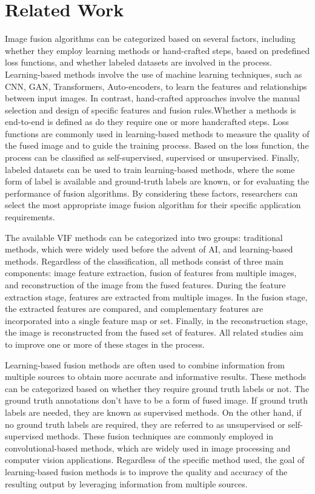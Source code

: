 \chapter{Related Work}
\label{chp:02bgwork}

Image fusion algorithms can be categorized based on several factors, including whether they employ learning methods or hand-crafted steps, based on predefined loss functions, and whether labeled datasets are involved in the process. Learning-based methods involve the use of machine learning techniques, such as CNN, GAN, Transformers, Auto-encoders, to learn the features and relationships between input images. In contrast, hand-crafted approaches involve the manual selection and design of specific features and fusion rules.Whether a methods is end-to-end is defined as do they require one or more handcrafted steps. Loss functions are commonly used in learning-based methods to measure the quality of the fused image and to guide the training process. Based on the loss function, the process can be classified as self-supervised, supervised or unsupervised. Finally, labeled datasets can be used to train learning-based methods, where the some form of label is available and ground-truth labels are known, or for evaluating the performance of fusion algorithms. By considering these factors, researchers can select the most appropriate image fusion algorithm for their specific application requirements.

The available VIF methods can be categorized into two groups: traditional methods, which were widely used before the advent of AI, and learning-based methods. Regardless of the classification, all methods consist of three main components: image feature extraction, fusion of features from multiple images, and reconstruction of the image from the fused features. During the feature extraction stage, features are extracted from multiple images. In the fusion stage, the extracted features are compared, and complementary features are incorporated into a single feature map or set. Finally, in the reconstruction stage, the image is reconstructed from the fused set of features. All related studies aim to improve one or more of these stages in the process.

Learning-based fusion methods are often used to combine information from multiple sources to obtain more accurate and informative results. These methods can be categorized based on whether they require ground truth labels or not. The ground truth annotations don't have to be a form of fused image. If ground truth labels are needed, they are known as supervised methods. On the other hand, if no ground truth labels are required, they are referred to as unsupervised or self-supervised methods. These fusion techniques are commonly employed in convolutional-based methods, which are widely used in image processing and computer vision applications. Regardless of the specific method used, the goal of learning-based fusion methods is to improve the quality and accuracy of the resulting output by leveraging information from multiple sources.


